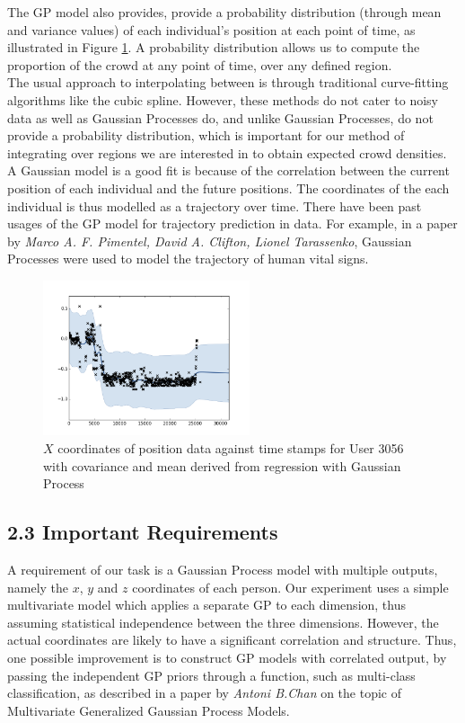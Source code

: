 \documentclass[letterpaper]{article}
\begin{document}
The GP model also provides, provide a probability distribution (through mean and variance values) of each individual's position at each point of time, as illustrated in Figure \ref{fig:GP1}. A probability distribution allows us to compute the proportion of the crowd at any point of time, over any defined region. \\

The usual approach to interpolating between is through traditional curve-fitting algorithms like the cubic spline. However, these methods do not cater to noisy data as well as Gaussian Processes do, and unlike Gaussian Processes, do not provide a probability distribution, which is important for our method of integrating over regions we are interested in to obtain expected crowd densities.\\

A Gaussian model is a good fit is because of the correlation between the current position of each individual and the future positions. The coordinates of the each individual is thus modelled as a trajectory over time. There have been past usages of the GP model for trajectory prediction in data. For example, in a paper by {\it Marco A. F. Pimentel, David A. Clifton, Lionel Tarassenko}, Gaussian Processes were used to model the trajectory of human vital signs.

\begin{figure}[!h]
  \centering
    \includegraphics[width=230px,natwidth=665,natheight=361]{selected_GP/3056.csv_X.png}
  \caption{$X$ coordinates of position data against time stamps for User 3056 with covariance and mean derived from regression with Gaussian Process}
  \label{fig:GP1}
\end{figure}

\subsection{2.3  Important Requirements}

A requirement of our task is a Gaussian Process model with multiple outputs, namely the $x$, $y$ and $z$ coordinates of each person. Our experiment uses a simple multivariate model which applies a separate GP to each dimension, thus assuming statistical independence between the three dimensions. However, the actual coordinates are likely to have a significant correlation and structure. Thus, one possible improvement is to construct GP models with correlated output, by passing the independent GP priors through a function, such as multi-class classification, as described in a paper by {\it Antoni B.Chan} on the topic of Multivariate Generalized Gaussian Process Models. \\
\end{document}
